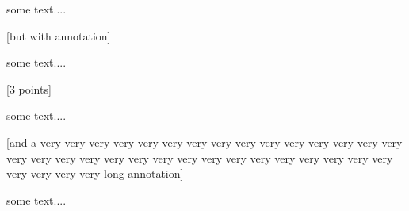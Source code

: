 \documentclass[11pt,a4paper]{article}
\begin{document}
some text....


[but with annotation]

some text....

[3 points]

some text....

[and a very very very very very very very very very very
very very very very very very very very very very
very very very very very very very very very very
very very very very very long annotation]

some text....
\end{document}
